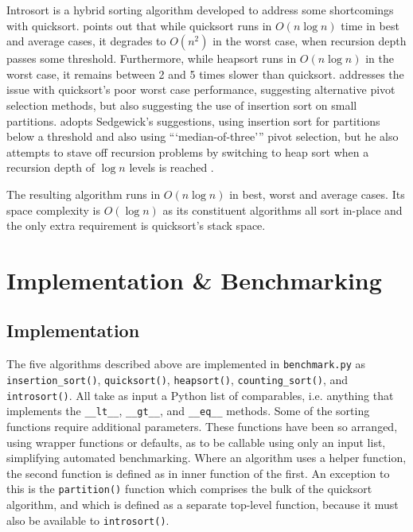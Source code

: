 \documentclass[12pt, a4paper]{article}
\begin{document}
Introsort is a hybrid sorting algorithm developed to address some shortcomings with quicksort. \textcite[983]{musser1997} points out that while quicksort runs in $O(n\log n)$ time in best and average cases, it degrades to $O(n^{2})$ in the worst case, when recursion depth passes some threshold. Furthermore, while heapsort runs in $O(n\log n)$ in the worst case, it remains between 2 and 5 times slower than quicksort. \textcite{Sedgewick-1978} addresses the issue with quicksort's poor worst case performance, suggesting alternative pivot selection methods, but also suggesting the use of insertion sort on small partitions. \textcite[986]{musser1997} adopts Sedgewick's suggestions, using insertion sort for partitions below a threshold and also using ```median-of-three''' pivot selection, but he also attempts to stave off recursion problems by switching to heap sort when a recursion depth of $\log n$ levels is reached \autocite{heineman2016algorithms}.

The resulting algorithm runs in $O(n\log n)$ in best, worst and average cases. Its space complexity is $O(\log n)$ as its constituent algorithms all sort in-place and the only extra requirement is quicksort's stack space.



\section{Implementation \& Benchmarking}\label{sec:impbench}

\subsection{Implementation}

The five algorithms described above are implemented in \texttt{benchmark.py} as \texttt{insertion\_sort()}, \texttt{quicksort()}, \texttt{heapsort()}, \texttt{counting\_sort()}, and \texttt{introsort()}. All take as input a Python list of comparables, i.e. anything that implements the \texttt{\_\_lt\_\_}, \texttt{\_\_gt\_\_}, and \texttt{\_\_eq\_\_} methods. Some of the sorting functions require additional parameters. These functions have been so arranged, using wrapper functions or defaults, as to be callable using only an input list, simplifying automated benchmarking. Where an algorithm uses a helper function, the second function is defined as in inner function of the first. An exception to this is the \texttt{partition()} function which comprises the bulk of the quicksort algorithm, and which is defined as a separate top-level function, because it must also be available to \texttt{introsort()}.
\end{document}
